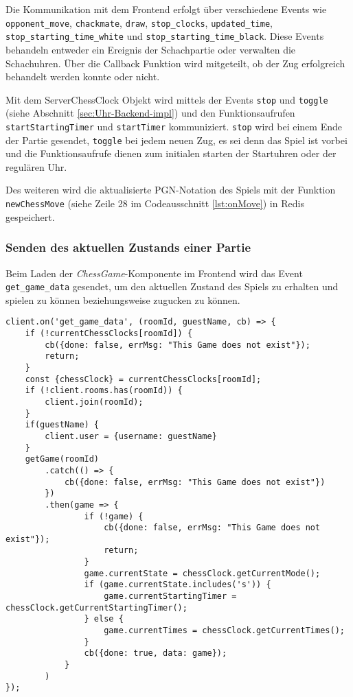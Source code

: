 Die Kommunikation mit dem Frontend erfolgt über verschiedene Events wie \linebreak \verb|opponent_move|, \verb|chackmate|, \verb|draw|, \verb|stop_clocks|, \verb|updated_time|,  \linebreak \verb|stop_starting_time_white| und \verb|stop_starting_time_black|. Diese Events behandeln entweder ein Ereignis der Schachpartie oder verwalten die Schachuhren. Über die Callback Funktion wird mitgeteilt, ob der Zug erfolgreich behandelt werden konnte oder nicht.

Mit dem ServerChessClock Objekt wird mittels der Events \verb|stop| und \verb|toggle| (siehe Abschnitt \ref{sec:Uhr-Backend-impl}) und den Funktionsaufrufen \verb|startStartingTimer| und \verb|startTimer| kommuniziert. \verb|stop| wird bei einem Ende der Partie gesendet, \verb|toggle| bei jedem neuen Zug, es sei denn das Spiel ist vorbei und die Funktionsaufrufe dienen zum initialen starten der Startuhren oder der regulären Uhr.

Des weiteren wird die aktualisierte PGN-Notation des Spiels mit der Funktion \linebreak \verb|newChessMove| (siehe Zeile 28 im Codeausschnitt \ref{lst:onMove}) in Redis gespeichert.

\subsubsection{Senden des aktuellen Zustands einer Partie}
Beim Laden der \textit{ChessGame}-Komponente im Frontend wird das Event \verb|get_game_data| gesendet, um den aktuellen Zustand des Spiels zu erhalten und spielen zu können beziehungsweise zugucken zu können. 


\begin{lstlisting}[style=codeStyle, caption={Der Listener des get\_game\_data Events zum übermitteln des Schachspiels}, label={lst:get_game_data}]
client.on('get_game_data', (roomId, guestName, cb) => {
    if (!currentChessClocks[roomId]) {
        cb({done: false, errMsg: "This Game does not exist"});
        return;
    }
    const {chessClock} = currentChessClocks[roomId];
    if (!client.rooms.has(roomId)) {
        client.join(roomId);
    }
    if(guestName) {
        client.user = {username: guestName}
    }
    getGame(roomId)
        .catch(() => {
            cb({done: false, errMsg: "This Game does not exist"})
        })
        .then(game => {
                if (!game) {
                    cb({done: false, errMsg: "This Game does not exist"});
                    return;
                }
                game.currentState = chessClock.getCurrentMode();
                if (game.currentState.includes('s')) {
                    game.currentStartingTimer = chessClock.getCurrentStartingTimer();
                } else {
                    game.currentTimes = chessClock.getCurrentTimes();
                }
                cb({done: true, data: game});
            }
        )
});
\end{lstlisting}

